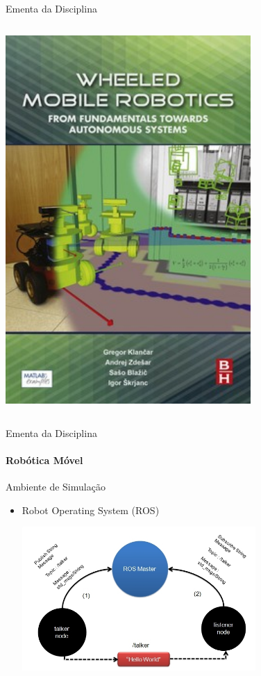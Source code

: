 \documentclass{beamer}
\begin{document}
\begin{frame}[c]{Ementa da Disciplina}
\begin{columns}[c]
\begin{column}{0.5\textwidth}
			\center
			\includegraphics[width=0.7\textwidth]{./images/livro4}
		\end{column}
	\end{columns}
\end{frame}



\begin{frame}[t]{Ementa da Disciplina}
	\framesubtitle{Robótica Móvel}
	\begin{block}{Ambiente de Simulação}
	\end{block}
	\begin{itemize}
		\item  Robot Operating System (ROS)
		      \begin{center}
			      \includegraphics[width=0.7\textwidth]{./images/ros_msgs.png}
		      \end{center}
	\end{itemize}
\end{frame}
\end{document}
